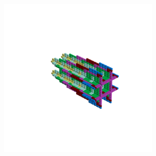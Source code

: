 \begin{minipage}[b]{0.50\linewidth}
\begin{figure}[H]
        \vspace*{-8cm}
        \hspace*{2cm}
        \includegraphics[width=8cm]{src/symmetries/pattern7_4-45.png}
        \vspace*{-2.5cm}
  \caption*{}
  \end{figure}
\end{minipage}
